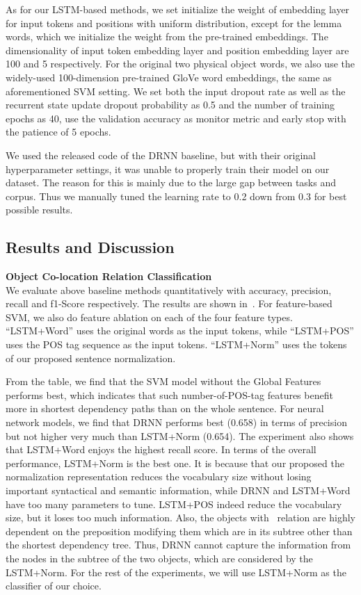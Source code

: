 As for our LSTM-based methods, we set initialize the weight of embedding layer for input tokens and positions with uniform distribution, except for the lemma words, which we initialize the weight from the pre-trained embeddings. The dimensionality of input token embedding layer and position embedding layer are 100 and 5 respectively. For the original two physical object words, we also use the widely-used 100-dimension pre-trained GloVe word embeddings, the same as aforementioned SVM setting. 
We set both the input dropout rate as well as the recurrent state update dropout probability as 0.5 and the number of training epochs as 40, use the validation accuracy as monitor metric and early stop with the patience of 5 epochs.

We used the released code of the DRNN baseline, but with their original hyperparameter settings, it was unable to properly train their model on our dataset. The reason for this is mainly due to the large gap between tasks and corpus. Thus we manually tuned the learning rate to 0.2 down from 0.3 for best possible results.

\subsection{Results and Discussion}
\textbf{Object Co-location Relation Classification}\\
We evaluate above baseline methods  quantitatively with accuracy, precision, recall and f1-Score respectively.
The results are shown in~.
For feature-based SVM, we also do feature ablation on each of the four feature types. 
``LSTM+Word'' uses the original words as the input tokens, while ``LSTM+POS'' uses the POS tag sequence as the input tokens. ``LSTM+Norm'' uses the tokens of our proposed sentence normalization. 

From the table, we find that the SVM model without the Global Features performs best, which indicates that such number-of-POS-tag features benefit more in shortest dependency paths than on the whole sentence.
For neural network models, we find that DRNN performs best (0.658) in terms of precision but not higher very much than  LSTM+Norm (0.654). 
The experiment also shows that LSTM+Word enjoys the highest recall score.
In terms of the overall performance, LSTM+Norm is the best one. 
It is because that our proposed the normalization representation reduces the vocabulary size without losing important syntactical and semantic information, while DRNN and LSTM+Word have too many parameters to tune. LSTM+POS indeed reduce the vocabulary size, but it loses too much information. 
Also, the objects with \lnear\ relation are highly dependent on the preposition modifying them which are in its subtree other than the shortest dependency tree. 
Thus, DRNN cannot capture the information from the nodes in the subtree of the two objects, which are considered by the LSTM+Norm. For the rest of the
experiments, we will use LSTM+Norm as the classifier of our choice.

